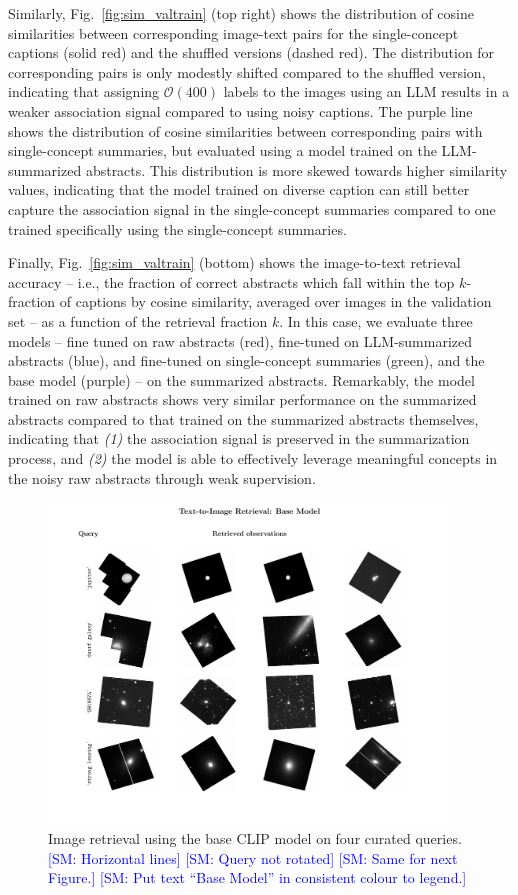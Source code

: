 \documentclass[10pt]{article} %
\newcommand{\SM}[1]{\textcolor{blue}{[SM: #1]}}
\begin{document}
Similarly, Fig.~\ref{fig:sim_valtrain} (top right) shows the distribution of cosine similarities between corresponding image-text pairs for the single-concept captions (solid red) and the shuffled versions (dashed red).
%
The distribution for corresponding pairs is only modestly shifted compared to the shuffled version, indicating that assigning $\mathcal O(400)$ labels to the images using an LLM results in a weaker association signal compared to using noisy captions.
%
The purple line shows the distribution of cosine similarities between corresponding pairs with single-concept summaries, but evaluated using a model trained on the LLM-summarized abstracts.
%
This distribution is more skewed towards higher similarity values, indicating that the model trained on diverse caption can still better capture the association signal in the single-concept summaries compared to one trained specifically using the single-concept summaries.

Finally, Fig.~\ref{fig:sim_valtrain} (bottom) shows the image-to-text retrieval accuracy -- i.e., the fraction of correct abstracts which fall within the top $k$-fraction of captions by cosine similarity, averaged over images in the validation set -- as a function of the retrieval fraction $k$.
%
In this case, we evaluate three models -- fine tuned on raw abstracts (red), fine-tuned on LLM-summarized abstracts (blue), and fine-tuned on single-concept summaries (green), and the base model (purple) -- on the summarized abstracts.
%
Remarkably, the model trained on raw abstracts shows very similar performance on the summarized abstracts compared to that trained on the summarized abstracts themselves, indicating that \emph{(1)} the association signal is preserved in the summarization process, and \emph{(2)} the model is able to effectively leverage meaningful concepts in the noisy raw abstracts through weak supervision.


\begin{figure}[!h]
\includegraphics[width=0.95\textwidth]{plots/tti_base.pdf}
\caption{Image retrieval using the base CLIP model on four curated queries. \SM{Horizontal lines} \SM{Query not rotated} \SM{Same for next Figure.} \SM{Put text ``Base Model'' in consistent colour to legend.}}
\label{fig:tti_base}
\end{figure}
\end{document}
